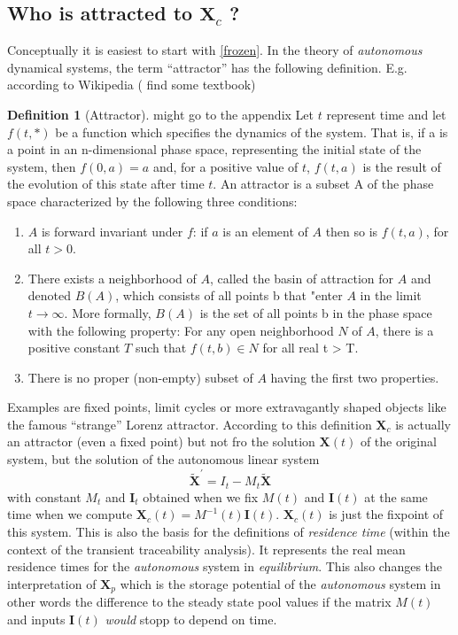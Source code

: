 \documentclass[journal abbreviation, manuscript]{copernicus}
\theoremstyle{definition}
\newtheorem{definition}{Definition}[section]
\newcommand{\X}{\mathbf{X}}
\newcommand{\I}{\mathbf{I}}
\begin{document}
\subsection{Who is attracted to $\X_c$ ?}
Conceptually it is easiest to start with \ref{frozen}.
In the theory of \emph{autonomous} dynamical systems,  the term ``attractor'' has the following definition. E.g. according to Wikipedia ({\color{red} find some textbook})
\begin{definition}[Attractor]
{\color{red} might go to the appendix}
  Let $t$ represent time and let $f(t, *)$ be a function which specifies the dynamics of the system. That is, if a is a point in an n-dimensional phase space, representing the initial state of the system, then $f(0, a) = a$ and, for a positive value of $t$, $f(t, a)$ is the result of the evolution of this state after time $t$. 
  An attractor is a subset A of the phase space characterized by the following three conditions:
  \begin{enumerate}
    \item
      $A$ is forward invariant under $f$: if $a$ is an element of $A$ then so is $f(t,a)$, for all $t > 0$.
    \item
      There exists a neighborhood of $A$, called the basin of attraction for
      $A$ and denoted $B(A)$, which consists of all points b that "enter $A$ in
      the limit $t\rightarrow \infty$.  More formally, $B(A)$ is the set of all
      points b in the phase space with the following property: For any open
      neighborhood $N$ of $A$, there is a positive constant $T$ such that
      $f(t,b)\in N$ for all real t > T.
    \item
      There is no proper (non-empty) subset of $A$ having the first two properties.
  \end{enumerate}

\end{definition}
Examples are fixed points, limit cycles or more extravagantly shaped objects like the  
famous ``strange'' Lorenz attractor. 
According to this definition $\X_c$ is actually an attractor (even a fixed point) but not fro the solution $\X(t)$ of the original system, but the solution of the autonomous linear system 
$$
\tilde{\X}^{\prime} = I_t - M_t \tilde{\X}
$$ 
with constant $M_t$ and $\I_t$  obtained
when we fix $M(t)$ and $\I(t)$ at the same time when we compute $\X_c(t)=M^{-1}(t)\I(t)$.
$\X_c(t)$ is just the fixpoint of this system. 
This is also the basis for the definitions of {\it residence time} (within the context of the transient traceability analysis).
It represents the real mean residence times for the  \emph{autonomous} system in \emph{equilibrium}.
This also changes the interpretation of $\X_p$ which is the storage potential of the \emph{autonomous} system in other words the difference to the steady state pool values if the matrix $M(t)$ and inputs $\I(t)$ \emph{would} stopp to depend on time.
\end{document}
